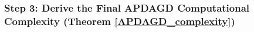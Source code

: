 \subsubsection{Step 3: Derive the Final APDAGD Computational Complexity (Theorem \ref{APDAGD_complexity})}
\label{step 3}
